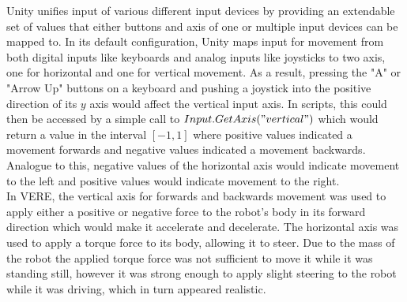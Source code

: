 Unity unifies input of various different input devices by providing an extendable set of values that either buttons and axis of one or multiple input devices can be mapped to. In its default configuration, Unity maps input for movement from both digital inputs like keyboards and analog inputs like joysticks to two axis, one for horizontal and one for vertical movement. As a result, pressing the "A" or "Arrow Up" buttons on a keyboard and pushing a joystick into the positive direction of its $y$ axis would affect the vertical input axis. In scripts, this could then be accessed by a simple call to $Input.GetAxis("vertical")$ which would return a value in the interval $[-1, 1]$ where positive values indicated a movement forwards and negative values indicated a movement backwards. Analogue to this, negative values of the horizontal axis would indicate movement to the left and positive values would indicate movement to the right.\\
In \ac{VERE}, the vertical axis for forwards and backwards movement was used to apply either a positive or negative force to the robot's body in its forward direction which would make it accelerate and decelerate. The horizontal axis was used to apply a torque force to its body, allowing it to steer. Due to the mass of the robot the applied torque force was not sufficient to move it while it was standing still, however it was strong enough to apply slight steering to the robot while it was driving, which in turn appeared realistic.

